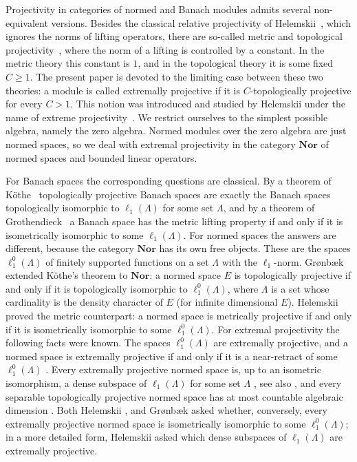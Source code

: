 \documentclass[12pt]{article}
\newcommand{\Nor}{\mathbf{Nor}}
\newcommand{\lo}[1]{\ell_1^0(#1)}
\newcommand{\ellone}[1]{\ell_1(#1)}
\begin{document}
Projectivity in categories of normed and Banach modules admits several
non-equivalent versions. Besides the classical relative projectivity of
Helemskii~\cite{HelHomolBanTopAlg}, which ignores the norms of lifting
operators, there are so-called metric and topological
projectivity~\cite{HelMetrFrQMod, WhiteInjmoduAlg}, where the
norm of a lifting is controlled by a constant. In the metric theory this
constant is $1$, and in the topological theory it is some fixed $C\geq 1$. The
present paper is devoted to the limiting case between these two theories: a
module is called extremally projective if it is $C$-topologically projective for
every $C>1$. This notion was introduced and studied by Helemskii under the name
of extreme projectivity~\cite{HelExtrProjSeqAlg, HelMetrFrQMod}. We restrict
ourselves to the simplest possible algebra, namely the zero algebra. Normed
modules over the zero algebra are just normed spaces, so we deal with extremal
projectivity in the category $\Nor$ of normed spaces and bounded linear
operators.

For Banach spaces the corresponding questions are classical. By a theorem of
K\"othe~\cite{KotheTopProjBanSp} topologically projective Banach spaces are
exactly the Banach spaces topologically isomorphic to $\ellone{\Lambda}$ for some
set $\Lambda$, and by a theorem of Grothendieck~\cite{GrothMetrProjFlatBanSp}
a Banach space has the metric lifting property if and only if it is
isometrically isomorphic to some $\ellone{\Lambda}$. For normed spaces the
answers are different, because the category $\Nor$ has its own free objects.
These are the spaces $\lo{\Lambda}$ of finitely supported functions on a set
$\Lambda$ with the $\ell_1$-norm. Gr{\o}nb{\ae}k~\cite{GronLiftProbNormSp}
extended K\"othe's theorem to $\Nor$: a normed space $E$ is topologically
projective if and only if it is topologically isomorphic to $\lo{\Lambda}$,
where $\Lambda$ is a set whose cardinality is the density character of $E$
(for infinite dimensional $E$).
Helemskii~\cite{HelMetrFrQMod} proved the metric counterpart: a normed space
is metrically projective if and only if it is isometrically isomorphic to some
$\lo{\Lambda}$. For extremal projectivity the following facts were known. The
spaces $\lo{\Lambda}$ are extremally projective, and a normed space is
extremally projective if and only if it is a near-retract of some
$\lo{\Lambda}$ \cite[proposition 2.2 and the proposition of the
introduction]{HelExtrProjSeqAlg}. Every
extremally projective normed space is, up to an isometric isomorphism, a
dense subspace of $\ellone{\Lambda}$ for some set $\Lambda$
\cite[proposition 2.3]{HelExtrProjSeqAlg}, see also
\cite[section 3]{GronLiftProbNormSp}, and every separable topologically
projective normed space has at most countable algebraic dimension
\cite[proposition 2.4]{HelExtrProjSeqAlg}. Both Helemskii
\cite[section 2]{HelExtrProjSeqAlg}, \cite[remark 3.6]{HelMetrFrQMod} and
Gr{\o}nb{\ae}k
\cite[conjecture 3.1]{GronLiftProbNormSp} asked whether, conversely, every
extremally projective normed space is isometrically isomorphic to some
$\lo{\Lambda}$; in a more detailed form, Helemskii asked which dense subspaces
of $\ellone{\Lambda}$ are extremally projective.
\end{document}
